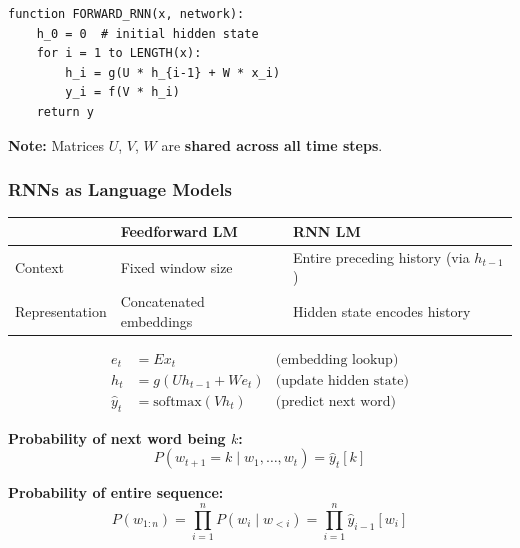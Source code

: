 \begin{exbox}
\begin{verbatim}
function FORWARD_RNN(x, network):
    h_0 = 0  # initial hidden state
    for i = 1 to LENGTH(x):
        h_i = g(U * h_{i-1} + W * x_i)
        y_i = f(V * h_i)
    return y
\end{verbatim}

\textbf{Note:} Matrices $U$, $V$, $W$ are \textbf{shared across all time steps}.
\end{exbox}

\bigseparator

\subsubsection{RNNs as Language Models}

\begin{keybox}
\begin{center}
\renewcommand{\arraystretch}{1.3}
\begin{tabular}{@{} l p{5cm} p{5cm} @{}}
\toprule
& \textbf{Feedforward LM} & \textbf{RNN LM} \\
\midrule
Context & Fixed window size & Entire preceding history (via $h_{t-1}$) \\
Representation & Concatenated embeddings & Hidden state encodes history \\
\bottomrule
\end{tabular}
\end{center}
\end{keybox}

\begin{defbox}
\begin{align*}
e_t &= E x_t & \text{(embedding lookup)} \\
h_t &= g(U h_{t-1} + W e_t) & \text{(update hidden state)} \\
\hat{y}_t &= \text{softmax}(V h_t) & \text{(predict next word)}
\end{align*}

\textbf{Probability of next word being $k$:}
\[
P(w_{t+1} = k \mid w_1, \ldots, w_t) = \hat{y}_t[k]
\]

\textbf{Probability of entire sequence:}
\[
P(w_{1:n}) = \prod_{i=1}^{n} P(w_i \mid w_{<i}) = \prod_{i=1}^{n} \hat{y}_{i-1}[w_i]
\]
\end{defbox}

\bigseparator

